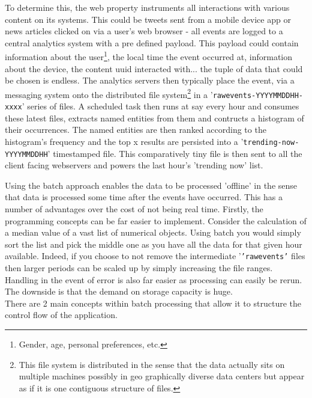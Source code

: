 \documentclass[a4paper,11pt]{scrreprt}
\begin{document}
To determine this, the web property instruments all interactions with various content on its systems. This could be tweets sent from a mobile device app or news articles clicked on via a user's web browser - all events are logged to a central analytics system with a pre defined payload. This payload could contain information about the user\footnote{Gender, age, personal preferences, etc.}, the local time the event occurred at, information about the device, the content \acrshort{uuid} interacted with... the tuple of data that could be chosen is endless. The analytics servers then typically place the event, via a messaging system onto the distributed file system\footnote{This file system is distributed in the sense that the data actually sits on multiple machines possibly in geo graphically diverse data centers but appear as if it is one contiguous structure of files.} in a '\texttt{rawevents-YYYYMMDDHH-xxxx}' series of files. A scheduled task then runs at say every hour and consumes these latest files, extracts named entities from them and contructs a histogram of their occurrences. The named entities are then ranked according to the histogram's frequency and the top x results are persisted into a '\texttt{trending-now-YYYYMMDDHH}' timestamped file. This comparatively tiny file is then sent to all the client facing webservers and powers the last hour's 'trending now' list.

Using the batch approach enables the data to be processed 'offline' in the sense that data is processed some time after the events have occurred.  This has a number of advantages over the cost of not being real time. Firstly, the programming concepts can be far easier to implement. Consider the calculation of a median value of a vast list of numerical objects. Using batch you would simply sort the list and pick the middle one as you have all the data for that given hour available. Indeed, if you choose to not remove the intermediate '\texttt{'rawevents'} files then larger periods can be scaled up by simply increasing the file ranges. Handling in the event of error is also far easier as processing can easily be rerun. The downside is that the demand on storage capacity is huge.\\

There are 2 main concepts within batch processing that allow it to structure the control flow of the application.
\end{document}
